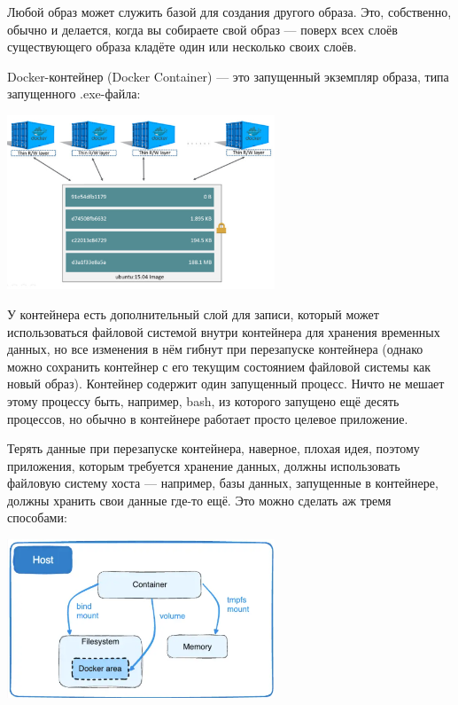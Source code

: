 \documentclass{../../text-style}
\begin{document}
Любой образ может служить базой для создания другого образа. Это, собственно, обычно и делается, когда вы собираете свой образ --- поверх всех слоёв существующего образа кладёте один или несколько своих слоёв.

Docker-контейнер (Docker Container) --- это запущенный экземпляр образа, типа запущенного .exe-файла:

\begin{center}
    \includegraphics[width=0.6\textwidth]{dockerContainer.png}
\end{center}

У контейнера есть дополнительный слой для записи, который может использоваться файловой системой внутри контейнера для хранения временных данных, но все изменения в нём гибнут при перезапуске контейнера (однако можно сохранить контейнер с его текущим состоянием файловой системы как новый образ). Контейнер содержит один запущенный процесс. Ничто не мешает этому процессу быть, например, bash, из которого запущено ещё десять процессов, но обычно в контейнере работает просто целевое приложение.

Терять данные при перезапуске контейнера, наверное, плохая идея, поэтому приложения, которым требуется хранение данных, должны использовать файловую систему хоста --- например, базы данных, запущенные в контейнере, должны хранить свои данные где-то ещё. Это можно сделать аж тремя способами:

\begin{center}
    \includegraphics[width=0.6\textwidth]{persistence.png}
\end{center}
\end{document}
